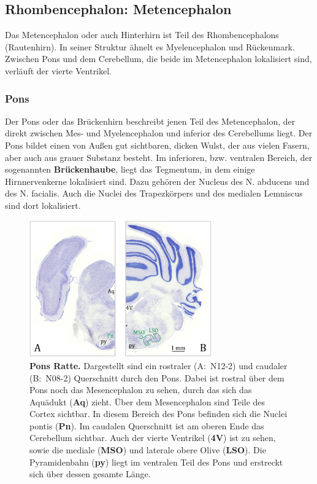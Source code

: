 \documentclass[12pt,a4paper,pdftex]{article}
\begin{document}
\subsection{Rhombencephalon: Metencephalon}
\label{subsec:Metencephalon} 

Das Metencephalon oder auch Hinterhirn ist Teil des Rhombencephalons (Rautenhirn). In seiner Struktur ähnelt es Myelencephalon und Rückenmark. Zwischen Pons und dem Cerebellum, die beide im Metencephalon lokalisiert sind, verläuft der vierte Ventrikel.


\subsubsection{Pons}
\label{subsubsec:Pons} 

Der Pons oder das Brückenhirn beschreibt jenen Teil des Metencephalon, der direkt zwischen Mes- und Myelencephalon und inferior des Cerebellums liegt. Der Pons bildet einen von Außen gut sichtbaren, dicken Wulst, der aus vielen Fasern, aber auch aus grauer Substanz besteht. Im inferioren, bzw. ventralen Bereich, der sogenannten \textbf{Brückenhaube}, liegt das Tegmentum, in dem einige Hirnnervenkerne lokalisiert sind. Dazu gehören der Nucleus des N. abducens und des N. facialis. Auch die Nuclei des Trapezkörpers und des medialen Lemniscus sind dort lokalisiert.

\begin{figure}[H]
    \centering
    \includegraphics[width=0.7\textwidth]{pictures/Bilder_Jule/Ratte/pons.png}
    \caption[Pons Ratte]{\textbf{Pons Ratte.} Dargestellt sind ein rostraler (A:~N12-2) und caudaler (B:~N08-2) Querschnitt durch den Pons. Dabei ist rostral über dem Pons noch das Mesencephalon zu sehen, durch das sich das Aquädukt (\textbf{Aq}) zieht. Über dem Mesencephalon sind Teile des Cortex sichtbar. In diesem Bereich des Pons befinden sich die Nuclei pontis (\textbf{Pn}). Im caudalen Querschnitt ist am oberen Ende das Cerebellum sichtbar. Auch der vierte Ventrikel (\textbf{4V}) ist zu sehen, sowie die mediale (\textbf{MSO}) und laterale obere Olive (\textbf{LSO}). Die Pyramidenbahn (\textbf{py}) liegt im ventralen Teil des Pons und erstreckt sich über dessen gesamte Länge.}
    \label{fig:pons_ratte}
\end{figure}{}
\end{document}
